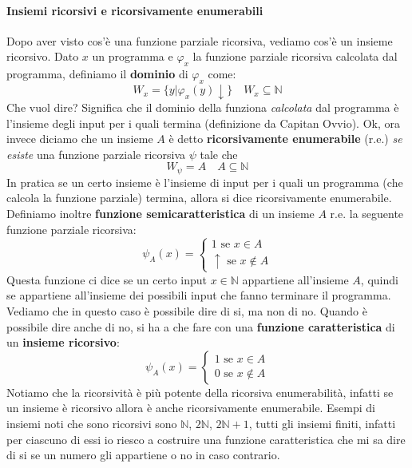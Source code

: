 \documentclass[a4paper,oneside]{scrbook}
\begin{document}
\paragraph{Insiemi ricorsivi e ricorsivamente enumerabili}
Dopo aver visto cos'è una funzione parziale ricorsiva, vediamo cos'è un insieme ricorsivo.
Dato $x$ un programma e $\varphi_x$ la funzione parziale ricorsiva calcolata dal programma, definiamo il \textbf{dominio} di $\varphi_x$ come:
\begin{equation*}
	W_x=\{y|\varphi_x(y)\downarrow \} \quad W_x \subseteq \mathbb{N}
\end{equation*}
Che vuol dire? Significa che il dominio della funziona \textit{calcolata} dal programma è l'insieme degli input per i quali termina (definizione da Capitan Ovvio).
Ok, ora invece diciamo che un insieme $A$ è detto \textbf{ricorsivamente enumerabile} (r.e.) \textit{se esiste} una funzione parziale ricorsiva $\psi$ tale che
\begin{equation*}
	W_\psi=A \quad A \subseteq \mathbb{N}
\end{equation*}
In pratica se un certo insieme è l'insieme di input per i quali un programma (che calcola la funzione parziale) termina, allora si dice ricorsivamente enumerabile.
Definiamo inoltre \textbf{funzione semicaratteristica} di un insieme $A$ r.e. la seguente funzione parziale ricorsiva:
\begin{equation*}
	\psi_A(x)=
	\begin{cases}
		1 \text{ se } x\in A\\
		\uparrow \text{ se } x\notin A
	\end{cases}
\end{equation*}
Questa funzione ci dice se un certo input $x\in\mathbb{N}$ appartiene all'insieme $A$, quindi se appartiene all'insieme dei possibili input
che fanno terminare il programma. Vediamo che in questo caso è possibile dire di si, ma non di no. Quando è possibile dire anche di no, si ha
a che fare con una \textbf{funzione caratteristica} di un \textbf{insieme ricorsivo}:
\begin{equation*}
	\psi_A(x)=
	\begin{cases}
		1 \text{ se } x\in A\\
		0 \text{ se } x\notin A
	\end{cases}
\end{equation*}
Notiamo che la ricorsività è più potente della ricorsiva enumerabilità, infatti se un insieme è ricorsivo allora è anche ricorsivamente enumerabile.
Esempi di insiemi noti che sono ricorsivi sono $\mathbb{N}$, $2\mathbb{N}$, $2\mathbb{N}+1$, tutti gli insiemi finiti, infatti per ciascuno di essi
io riesco a costruire una funzione caratteristica che mi sa dire di si se un numero gli appartiene o no in caso contrario.
\end{document}

